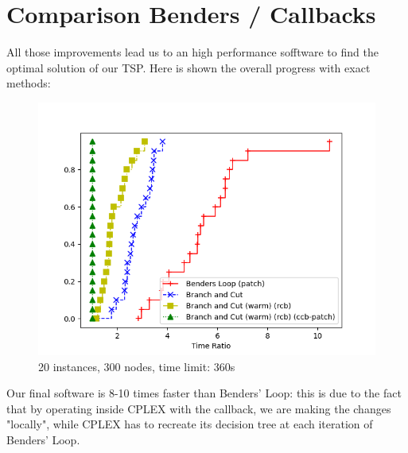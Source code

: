 \newpage

\section{Comparison Benders / Callbacks}
All those improvements lead us to an high performance sofftware to find the optimal solution of our TSP. Here is shown the overall progress with exact methods:

\FloatBarrier
\begin{figure}[h]
    \centering
    \includegraphics*[width=.6\textwidth]{../plots/perfprof_exact_times_result.png}
    \caption*{20 instances, 300 nodes, time limit: 360s}
\end{figure}
\FloatBarrier

Our final software is 8-10 times faster than Benders' Loop: this is due to the fact that by operating inside CPLEX with the callback, we are making the changes "locally", while CPLEX has to recreate its decision tree at each iteration of Benders' Loop.